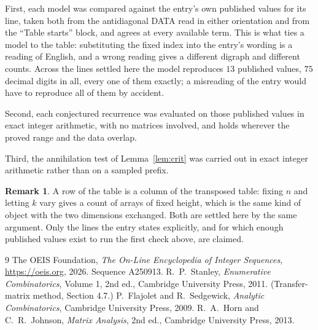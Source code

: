 \documentclass[11pt,a4paper]{article}
\theoremstyle{plain}
\theoremstyle{definition}
\newtheorem{remark}[theorem]{Remark}
\begin{document}
First, each model was compared against the entry's own published values for its line, taken
both from the antidiagonal DATA read in either orientation and from the ``Table starts''
block, and agrees at every available term. This is what ties a model to the table:
substituting the fixed index into the entry's wording is a reading of English, and a wrong
reading gives a different digraph and different counts. Across the lines settled here the
model reproduces $13$ published values, $75$ decimal digits in all, every one of
them exactly; a misreading of the entry would have to reproduce all of them by accident.

Second, each conjectured recurrence was evaluated on those published values in exact
integer arithmetic, with no matrices involved, and holds wherever the proved range and the
data overlap.

Third, the annihilation test of Lemma~\ref{lem:crit} was carried out in exact integer
arithmetic rather than on a sampled prefix.

\begin{remark}
A row of the table is a column of the transposed table: fixing $n$ and letting $k$ vary gives a
count of arrays of fixed height, which is the same kind of object with the two dimensions
exchanged. Both are settled here by the same argument. Only the lines the entry states
explicitly, and for which enough published values exist to run the first check above, are
claimed.
\end{remark}

\begin{thebibliography}{9}
 The OEIS Foundation, \emph{The On-Line Encyclopedia of Integer
Sequences}, \url{https://oeis.org}, 2026. Sequence A250913.
 R.~P.~Stanley, \emph{Enumerative Combinatorics}, Volume 1, 2nd ed.,
Cambridge University Press, 2011. (Transfer-matrix method, Section 4.7.)
 P.~Flajolet and R.~Sedgewick, \emph{Analytic Combinatorics}, Cambridge
University Press, 2009.
 R.~A.~Horn and C.~R.~Johnson, \emph{Matrix Analysis}, 2nd ed., Cambridge
University Press, 2013.
\end{thebibliography}
\end{document}
